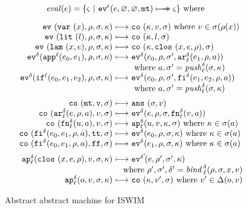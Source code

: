 \documentclass[preprint,onecolumn,9pt]{sigplanconf} %
\begin{document}
\begin{figure}
\begin{gather*}
\begin{align*}
\eval(\mexp) &= \{ \mstate\ |\ \ev[^{\mtcntr}]{\mexp,\varnothing,\varnothing,\kmt} \multimachstep \mstate \} \text{ where }
\end{align*}
\\[2mm]
\begin{array}{@{}r@{\ }c@{\ }l@{}}
\ev{\svar\mvar,\menv,\msto,\mkont} &\machstep&
\co{\mkont,\mval,\msto}
\text{ where }\mval \in \msto(\menv(\mvar))
\\
\ev{\slit\mlit,\menv,\msto,\mkont} &\machstep&
\co{\mkont,\mlit,\msto}
\\
\ev{\slam\mvar\mexp,\menv,\msto,\mkont} &\machstep&
\co{\mkont,\clos{\mvar,\mexp,\menv},\msto}
\\
\ev[^\mcntr]{\sapp[^\mlab]{\mexpi0}{\mexpi1},\menv,\msto,\mkont} &\machstep&
\ev[^\mcntr]{\mexpi{0},\menv,\msto',\kar[_\mlab^\mcntr]{\mexpi{1},\menv,\maddr}}
\\
&&
\text{ where }\maddr,\msto' = \mathit{push}^\mcntr_\mlab(\msto,\mkont)
\\
\ev[^\mcntr]{\sif[^\mlab]{\mexpi0}{\mexpi1}{\mexpi2},\menv,\msto,\mkont} &\machstep&
\ev[^\mcntr]{\mexpi0,\menv,\msto',\kif[^\mcntr]{\mexpi1,\mexpi2,\menv,\maddr}}
\\
&&
\text{ where }\maddr,\msto' = \mathit{push}_\mlab^\mcntr(\msto,\mkont)
\\[2mm]
\co{\kmt,\mval,\msto} &\machstep&
\ans{\msto,\mval}
\\
\co{\kar[^\mcntr_\mlab]{\mexp,\menv,\maddr},\mval,\msto} & \machstep&
\ev[^\mcntr]{\mexp,\menv,\msto,\kfn[^\mcntr_\mlab]{\mval,\maddr}}
\\
\co{\kfn[^\mcntr_\mlab]{{\mvalx{u}},\maddr},\mval,\msto} & \machstep&
\ap[^\mcntr_\mlab]{\mvalx{u},\mval,\mkont,\msto}
\text{ where }\mkont \in \msto(\maddr)
\\
\co{\kif[^\mcntr]{\mexpi0,\mexpi1,\menv,\maddr},\strue,\msto} & \machstep&
\ev[^\mcntr]{\mexpi0,\menv,\msto,\mkont}
\text{ where }\mkont\in\msto(\maddr)
\\
\co{\kif[^\mcntr]{\mexpi0,\mexpi1,\menv,\maddr},\sfalse,\msto} & \machstep&
\ev[^\mcntr]{\mexpi1,\menv,\msto,\mkont}
\text{ where }\mkont\in\msto(\maddr)
\\[2mm]
\ap[^\mcntr_\mlab]{\clos{\mvar,\mexp,\menv},\mval,\msto,\mkont} & \machstep&
\ev[^{\mcntr'}\!]{\mexp,\menv',\msto',\mkont}
\\
\multicolumn{3}{r@{}}{
\text{ where }\menv',\msto',\mcntr' = \mathit{bind\,}^{ \mcntr}_\mlab(\menv,\msto,\mvar,\mval)}
\\
\ap[^\mcntr_\mlab]{\mop,\mval,\msto,\mkont} & \machstep&
\co{\mkont,\mval',\msto}
\text{ where } \mval'\in\interpdelta(\mop,\mval)
\end{array}
\end{gather*}
\caption{Abstract abstract machine for ISWIM}
\label{fig:aam}
\end{figure}
\end{document}
